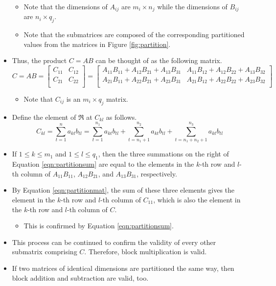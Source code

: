 \documentclass[titlepage]{article}
\numberwithin{figure}{section}
\numberwithin{equation}{section}
\numberwithin{theorem}{section}
\begin{document}
\begin{itemize}
    \begin{itemize}
        \item Note that the dimensions of $A_{ij}$ are $m_i\times n_j$ while the dimensions of $B_{ij}$ are $n_i\times q_j$.
        \item Note that the submatrices are composed of the corresponding partitioned values from the matrices in Figure \ref{fig:partition}.
    \end{itemize}
    \item Thus, the product $C=AB$ can be thought of as the following matrix.
    \begin{equation}\label{eqn:partitionmat}
        C = AB =
        \begin{bmatrix}
            C_{11} & C_{12}\\
            C_{21} & C_{22}\\
        \end{bmatrix}
        =
        \begin{bmatrix}
            A_{11}B_{11}+A_{12}B_{21}+A_{13}B_{31} & A_{11}B_{12}+A_{12}B_{22}+A_{13}B_{32}\\
            A_{21}B_{11}+A_{22}B_{21}+A_{23}B_{31} & A_{21}B_{12}+A_{22}B_{22}+A_{23}B_{32}\\
        \end{bmatrix}
    \end{equation}
    \renewcommand{\arraystretch}{1}
    \begin{itemize}
        \item Note that $C_{ij}$ is an $m_i\times q_j$ matrix.
    \end{itemize}
    \item Define the element of $\mathfrak{R}$ at $C_{kl}$ as follows.
    \begin{equation}\label{eqn:partitionsum}
        C_{kl} = \sum_{t=1}^n a_{kt}b_{tl}
        = \sum_{t=1}^{n_1} a_{kt}b_{tl} + \sum_{t=n_1+1}^{n_2} a_{kt}b_{tl} + \sum_{t=n_1+n_2+1}^{n_3} a_{kt}b_{tl}
    \end{equation}
    \item If $1\leq k\leq m_1$ and $1\leq l\leq q_1$, then the three summations on the right of Equation \ref{eqn:partitionsum} are equal to the elements in the $k$-th row and $l$-th column of $A_{11}B_{11}$, $A_{12}B_{21}$, and $A_{13}B_{31}$, respectively.
    \item By Equation \ref{eqn:partitionmat}, the sum of these three elements gives the element in the $k$-th row and $l$-th column of $C_{11}$, which is also the element in the $k$-th row and $l$-th column of $C$.
    \begin{itemize}
        \item This is confirmed by Equation \ref{eqn:partitionsum}.
    \end{itemize}
    \item This process can be continued to confirm the validity of every other submatrix comprising $C$. Therefore, block multiplication is valid.
    \item If two matrices of identical dimensions are partitioned the same way, then block addition and subtraction are valid, too.
\end{itemize}
\newpage
\end{document}
